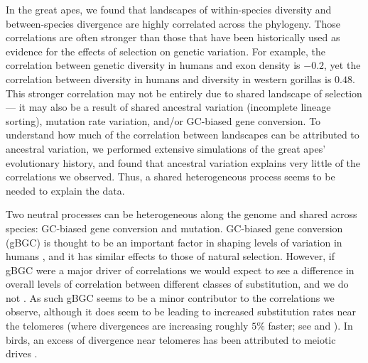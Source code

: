 In the great apes, we found that landscapes of within-species diversity and between-species divergence are 
highly correlated across the phylogeny.
Those correlations are often stronger than those that have been historically used as evidence for the effects of selection on genetic variation.
For example, the correlation between genetic diversity in humans and exon density is $-0.2$, 
yet the correlation between diversity in humans and diversity in western gorillas is $0.48$.
This stronger correlation may not be entirely due to shared landscape of selection --- it may also be a result of shared ancestral variation (\ie incomplete lineage sorting), mutation rate variation,
and/or GC-biased gene conversion.
To understand how much of the correlation between landscapes can be attributed to ancestral variation,
we performed extensive simulations of the great apes' evolutionary history,
and found that ancestral variation explains very little of the correlations we observed.
Thus, a shared heterogeneous process seems to be needed to explain the data.

Two neutral processes can be heterogeneous along the genome and shared across species:
GC-biased gene conversion and mutation.
GC-biased gene conversion (gBGC) is thought to be an important factor in shaping levels of variation in humans \citep{chen_gene_2007, pouyet_background_2018, glemin_quantification_2015},
and it has similar effects to those of natural selection.
However, if gBGC were a major driver of correlations we would expect to see a difference in overall levels
of correlation between different classes of substitution, and we do not .
As such gBGC seems to be a minor contributor to the correlations we observe,
although it does seem to be leading to increased substitution rates
near the telomeres
(where divergences are increasing roughly $5\%$ faster; see  and ).
In birds,  an excess of divergence near telomeres has been attributed to meiotic drives \citep{ellegren_genomic_2012}.


